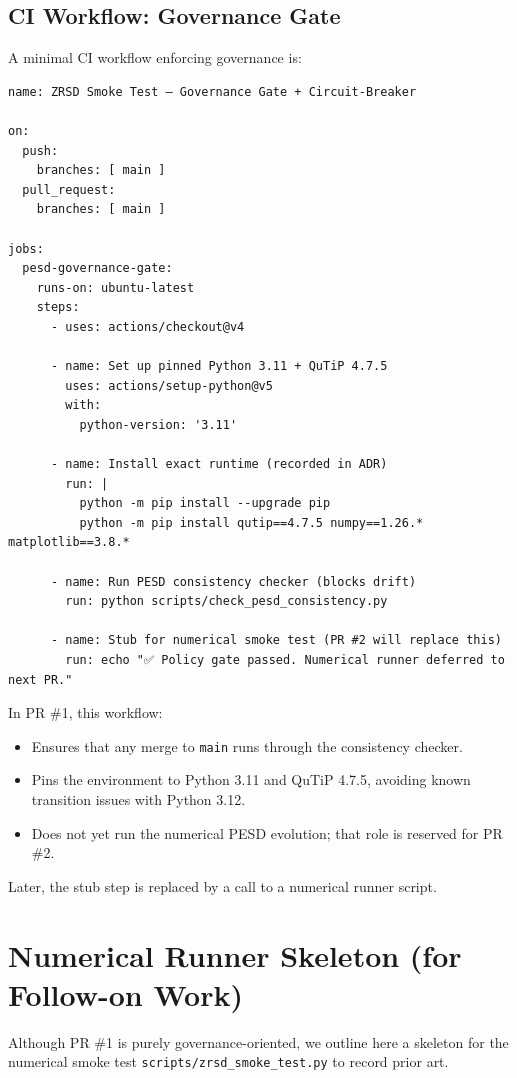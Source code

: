 \documentclass[11pt]{article}
\begin{document}
\subsection{CI Workflow: Governance Gate}

A minimal CI workflow enforcing governance is:

\begin{verbatim}
name: ZRSD Smoke Test – Governance Gate + Circuit-Breaker

on:
  push:
    branches: [ main ]
  pull_request:
    branches: [ main ]

jobs:
  pesd-governance-gate:
    runs-on: ubuntu-latest
    steps:
      - uses: actions/checkout@v4

      - name: Set up pinned Python 3.11 + QuTiP 4.7.5
        uses: actions/setup-python@v5
        with:
          python-version: '3.11'

      - name: Install exact runtime (recorded in ADR)
        run: |
          python -m pip install --upgrade pip
          python -m pip install qutip==4.7.5 numpy==1.26.* matplotlib==3.8.*

      - name: Run PESD consistency checker (blocks drift)
        run: python scripts/check_pesd_consistency.py

      - name: Stub for numerical smoke test (PR #2 will replace this)
        run: echo "✅ Policy gate passed. Numerical runner deferred to next PR."
\end{verbatim}

In PR \#1, this workflow:

\begin{itemize}[nosep]
  \item Ensures that any merge to \texttt{main} runs through the consistency checker.
  \item Pins the environment to Python 3.11 and QuTiP 4.7.5, avoiding known transition issues with Python 3.12.
  \item Does not yet run the numerical PESD evolution; that role is reserved for PR \#2.
\end{itemize}

Later, the stub step is replaced by a call to a numerical runner script.

\section{Numerical Runner Skeleton (for Follow-on Work)}

Although PR \#1 is purely governance-oriented, we outline here a skeleton for the numerical smoke test \texttt{scripts/zrsd\_smoke\_test.py} to record prior art.
\end{document}

